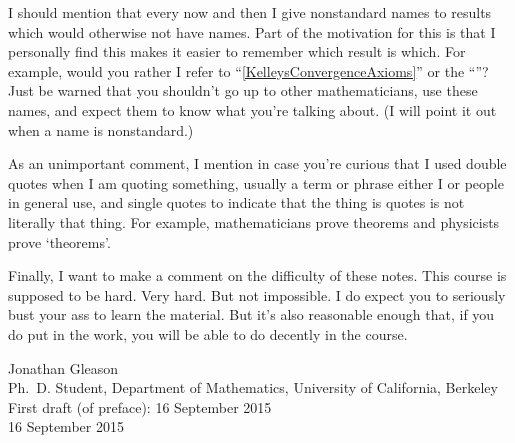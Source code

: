 I should mention that every now and then I give nonstandard names to results which would otherwise not have names.  Part of the motivation for this is that I personally find this makes it easier to remember which result is which.  For example, would you rather I refer to ``\cref{KelleysConvergenceAxioms}'' or the ``''?  Just be warned that you shouldn't go up to other mathematicians, use these names, and expect them to know what you're talking about.  (I will point it out when a name is nonstandard.)

As an unimportant comment, I mention in case you're curious that I used double quotes when I am quoting something, usually a term or phrase either I or people in general use, and single quotes to indicate that the thing is quotes is not literally that thing.  For example, mathematicians prove theorems and physicists prove `theorems'.

Finally, I want to make a comment on the difficulty of these notes.  This course is supposed to be hard.  Very hard.  But not impossible.  I do expect you to seriously bust your ass to learn the material.  But it's also reasonable enough that, if you do put in the work, you will be able to do decently in the course.

\blankline
\horizontalrule
\blankline

\hfill Jonathan Gleason \\
\hfill Ph.~D. Student, Department of Mathematics, University of California, Berkeley \\
\hfill First draft (of preface):  16 September 2015 \\
\hfill 16 September 2015

